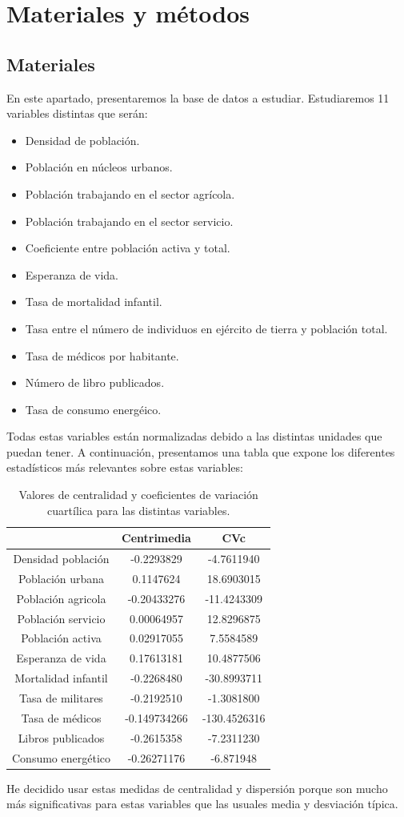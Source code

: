 \section{Materiales y métodos}

\subsection{Materiales}
En este apartado, presentaremos la base de datos a estudiar. Estudiaremos 11 variables distintas que serán:
\begin{itemize}
\item Densidad de población.
\item Población en núcleos urbanos.
\item Población trabajando en el sector agrícola.
\item Población trabajando en el sector servicio.
\item Coeficiente entre población activa y total.
\item Esperanza de vida.
\item Tasa de mortalidad infantil.
\item Tasa entre el número de individuos en ejército de tierra y población total.
\item Tasa de médicos por habitante.
\item Número de libro publicados.
\item Tasa de consumo energéico.
\end{itemize}

Todas estas variables están normalizadas debido a las distintas unidades que puedan tener. A continuación, presentamos una tabla que expone los diferentes estadísticos más relevantes sobre estas variables:

\begin{table}[H]
\begin{centering}
\begin{tabular}{|c|c|c|}
\hline 
 & Centrimedia & CVc\tabularnewline
\hline 
\hline 
Densidad población & -0.2293829 & -4.7611940\tabularnewline
\hline 
Población urbana & 0.1147624 & 18.6903015\tabularnewline
\hline 
Población agricola & -0.20433276 & -11.4243309\tabularnewline
\hline 
Población servicio & 0.00064957 & 12.8296875\tabularnewline
\hline 
Población activa & 0.02917055 & 7.5584589\tabularnewline
\hline 
Esperanza de vida & 0.17613181 & 10.4877506\tabularnewline
\hline 
Mortalidad infantil & -0.2268480 & -30.8993711\tabularnewline
\hline 
Tasa de militares & -0.2192510 & -1.3081800\tabularnewline
\hline 
Tasa de médicos & -0.149734266 & -130.4526316\tabularnewline
\hline 
Libros publicados & -0.2615358 & -7.2311230\tabularnewline
\hline 
Consumo energético & -0.26271176 & -6.871948\tabularnewline
\hline 
\end{tabular}
\par\end{centering}
\caption{Valores de centralidad y coeficientes de variación cuartílica para
las distintas variables.}
He decidido usar estas medidas de centralidad y dispersión porque son mucho más significativas para estas variables que las usuales media y desviación típica.
\end{table}

